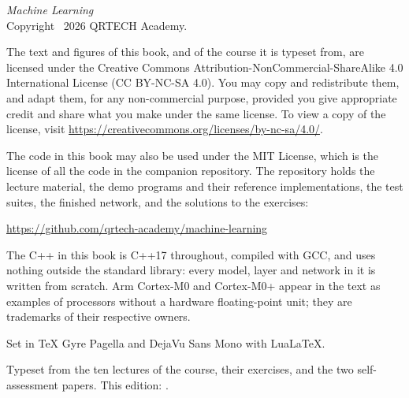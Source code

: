 \thispagestyle{empty}
\vspace*{\fill}
{\small
\noindent\textit{Machine Learning}\\
Copyright \textcopyright\ 2026 QRTECH Academy.

\medskip
\noindent The text and figures of this book, and of the course it is typeset from, are licensed
under the Creative Commons Attribution-NonCommercial-ShareAlike 4.0 International License
(CC BY-NC-SA 4.0). You may copy and redistribute them, and adapt them, for any non-commercial
purpose, provided you give appropriate credit and share what you make under the same license. To
view a copy of the license, visit \url{https://creativecommons.org/licenses/by-nc-sa/4.0/}.

\medskip
\noindent The code in this book may also be used under the MIT License, which is the license of all
the code in the companion repository. The repository holds the lecture material, the demo programs
and their reference implementations, the test suites, the finished network, and the solutions to
the exercises:

\medskip
\noindent\url{https://github.com/qrtech-academy/machine-learning}

\medskip
\noindent The C++ in this book is C++17 throughout, compiled with GCC, and uses nothing outside the
standard library: every model, layer and network in it is written from scratch. Arm Cortex-M0 and
Cortex-M0+ appear in the text as examples of processors without a hardware floating-point unit;
they are trademarks of their respective owners.

\medskip
\noindent Set in TeX Gyre Pagella and DejaVu Sans Mono with Lua\LaTeX.

\medskip
\noindent\textcolor{muted}{Typeset from the ten lectures of the course, their exercises, and the
two self-assessment papers. This edition: \bookedition.}
\par}
\cleardoublepage
